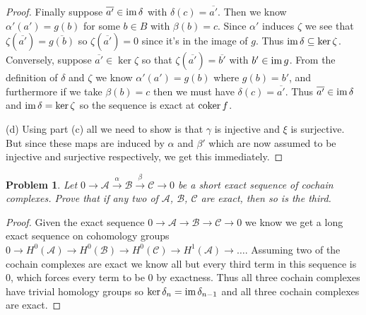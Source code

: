 \documentclass{article}
\newtheorem{problem}{Problem}
\newcommand{\coker}{\textup{coker}\,}
\newcommand{\im}{\textup{im}\,}
\begin{document}
\begin{proof}
Finally suppose $\overline{a'} \in \im \delta$ with $\delta(c) = \overline{a'}$. Then we know $\alpha'(a') = g(b)$ for some $b \in B$ with $\beta(b) = c$. Since $\alpha'$ induces $\zeta$ we see that $\zeta(\overline{a'}) = \overline{g(b)}$ so $\zeta(\overline{a'}) = 0$ since it's in the image of $g$. Thus $\im \delta \subseteq \ker \zeta$. Conversely, suppose $\overline{a'} \in \ker \zeta$ so that $\zeta(\overline{a'}) = \overline{b'}$ with $b' \in \im g$. From the definition of $\delta$ and $\zeta$ we know $\alpha'(a') = g(b)$ where $g(b) = b'$, and furthermore if we take $\beta(b) = c$ then we must have $\delta(c) = \overline{a'}$. Thus $\overline{a'} \in \im \delta$ and $\im \delta = \ker \zeta$ so the sequence is exact at $\coker f$.

(d) Using part (c) all we need to show is that $\gamma$ is injective and $\xi$ is surjective. But since these maps are induced by $\alpha$ and $\beta'$ which are now assumed to be injective and surjective respectively, we get this immediately.
\end{proof}

\begin{problem}
Let $0 \to \mathcal{A} \stackrel{\alpha}{\to} \mathcal{B} \stackrel{\beta}{\to} \mathcal{C} \to 0$ be a short exact sequence of cochain complexes. Prove that if any two of $\mathcal{A}$, $\mathcal{B}$, $\mathcal{C}$ are exact, then so is the third.
\end{problem}
\begin{proof}
Given the exact sequence $0 \to \mathcal{A} \to \mathcal{B} \to \mathcal{C} \to 0$ we know we get a long exact sequence on cohomology groups $0 \to H^0(\mathcal{A}) \to H^0(\mathcal{B}) \to H^0(\mathcal{C}) \to H^1(\mathcal{A}) \to \dots$. Assuming two of the cochain complexes are exact we know all but every third term in this sequence is $0$, which forces every term to be $0$ by exactness. Thus all three cochain complexes have trivial homology groups so $\ker \delta_n = \im \delta_{n-1}$ and all three cochain complexes are exact.
\end{proof}
\end{document}

